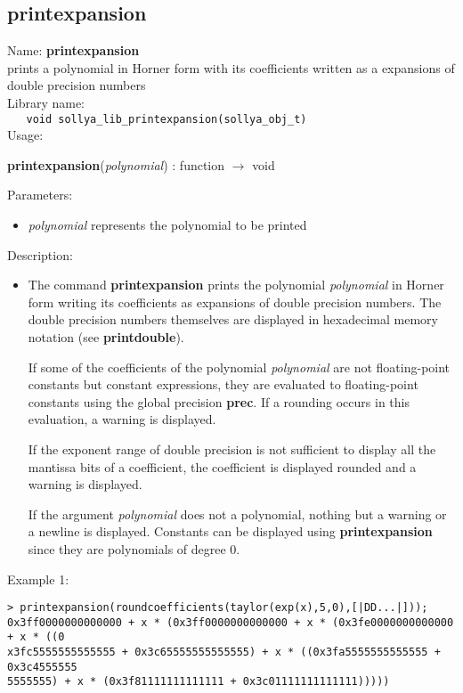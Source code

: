 \subsection{printexpansion}
\label{labprintexpansion}
\noindent Name: \textbf{printexpansion}\\
\phantom{aaa}prints a polynomial in Horner form with its coefficients written as a expansions of double precision numbers\\[0.2cm]
\noindent Library name:\\
\verb|   void sollya_lib_printexpansion(sollya_obj_t)|\\[0.2cm]
\noindent Usage: 
\begin{center}
\textbf{printexpansion}(\emph{polynomial}) : \textsf{function} $\rightarrow$ \textsf{void}\\
\end{center}
Parameters: 
\begin{itemize}
\item \emph{polynomial} represents the polynomial to be printed
\end{itemize}
\noindent Description: \begin{itemize}

\item The command \textbf{printexpansion} prints the polynomial \emph{polynomial} in Horner form
   writing its coefficients as expansions of double precision
   numbers. The double precision numbers themselves are displayed in
   hexadecimal memory notation (see \textbf{printdouble}). 
    
   If some of the coefficients of the polynomial \emph{polynomial} are not
   floating-point constants but constant expressions, they are evaluated
   to floating-point constants using the global precision \textbf{prec}.  If a
   rounding occurs in this evaluation, a warning is displayed.
    
   If the exponent range of double precision is not sufficient to display
   all the mantissa bits of a coefficient, the coefficient is displayed
   rounded and a warning is displayed.
    
   If the argument \emph{polynomial} does not a polynomial, nothing but a
   warning or a newline is displayed. Constants can be displayed using
   \textbf{printexpansion} since they are polynomials of degree $0$.
\end{itemize}
\noindent Example 1: 
\begin{center}\begin{minipage}{15cm}\begin{Verbatim}[frame=single]
> printexpansion(roundcoefficients(taylor(exp(x),5,0),[|DD...|]));
0x3ff0000000000000 + x * (0x3ff0000000000000 + x * (0x3fe0000000000000 + x * ((0
x3fc5555555555555 + 0x3c65555555555555) + x * ((0x3fa5555555555555 + 0x3c4555555
5555555) + x * (0x3f81111111111111 + 0x3c01111111111111)))))
\end{Verbatim}
\end{minipage}\end{center}
